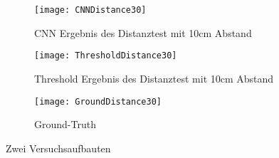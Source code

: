 \begin{figure}[h!]
	\begin{subfigure}{.5\linewidth}
		\texttt{[image: CNNDistance30]}
		\caption{CNN Ergebnis des Distanztest mit 10cm Abstand}
		\label{fig:versuchaufbaunmr1}
	\end{subfigure}\hfill%
	\begin{subfigure}{.5\linewidth}
		\centering
		\texttt{[image: ThresholdDistance30]}
		\caption{Threshold Ergebnis des Distanztest mit 10cm Abstand}
		\label{fig:versuchaufbaunmr7}
	\end{subfigure}
	\begin{subfigure}{.8\linewidth}
		\centering
		\texttt{[image: GroundDistance30]}
		\caption{Ground-Truth}
		\label{fig:versuchaufbaunmr7}
	\end{subfigure}
	\caption{Zwei Versuchsaufbauten}
	\label{fig:versuchsaufbauten}
\end{figure}

